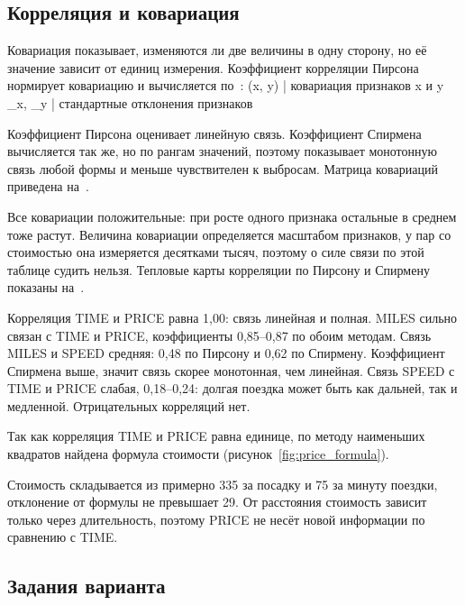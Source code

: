 \documentclass[a4paper,14pt]{extarticle}
\begin{document}
\subsection{Корреляция и ковариация}
\label{sec:correlation}

Ковариация показывает, изменяются ли две величины в одну сторону, но её значение зависит от единиц измерения. Коэффициент корреляции Пирсона нормирует ковариацию и вычисляется по~:
(x, y) | ковариация признаков x и y
\sigma_x, \sigma_y | стандартные отклонения признаков

Коэффициент Пирсона оценивает линейную связь. Коэффициент Спирмена вычисляется так же, но по рангам значений, поэтому показывает монотонную связь любой формы и меньше чувствителен к выбросам. Матрица ковариаций приведена на~.


Все ковариации положительные: при росте одного признака остальные в среднем тоже растут. Величина ковариации определяется масштабом признаков, у пар со стоимостью она измеряется десятками тысяч, поэтому о силе связи по этой таблице судить нельзя. Тепловые карты корреляции по Пирсону и Спирмену показаны на~.


Корреляция TIME и PRICE равна 1,00: связь линейная и полная. MILES сильно связан с TIME и PRICE, коэффициенты 0,85–0,87 по обоим методам. Связь MILES и SPEED средняя: 0,48 по Пирсону и 0,62 по Спирмену. Коэффициент Спирмена выше, значит связь скорее монотонная, чем линейная. Связь SPEED с TIME и PRICE слабая, 0,18–0,24: долгая поездка может быть как дальней, так и медленной. Отрицательных корреляций нет.

Так как корреляция TIME и PRICE равна единице, по методу наименьших квадратов найдена формула стоимости (рисунок~\ref{fig:price_formula}).


Стоимость складывается из примерно 335 за посадку и 75 за минуту поездки, отклонение от формулы не превышает 29. От расстояния стоимость зависит только через длительность, поэтому PRICE не несёт новой информации по сравнению с TIME.

\subsection{Задания варианта}
\end{document}

